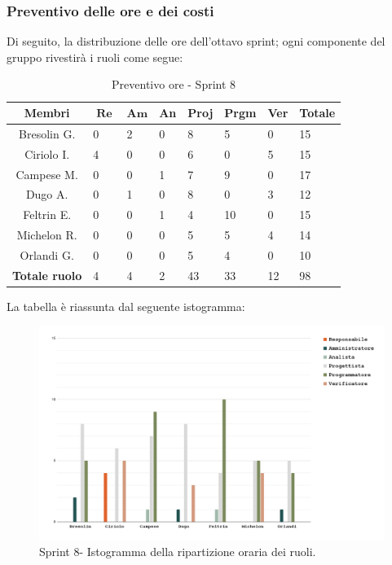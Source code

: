 \documentclass[10pt, a4paper]{article}
\begin{document}
\subsubsection{Preventivo delle ore e dei costi}
Di seguito, la distribuzione delle ore dell'ottavo sprint; ogni componente del gruppo rivestirà i ruoli come segue:
\begin{table}[H]
\begin{tabularx}{\textwidth}{c|X|X|X|X|X|X|X}
    \textbf{Membri} & $\operatorname{\textbf{Re}}$ & $\mathrm{\textbf{Am}}$ & \textbf{An} & \textbf{Proj} & \textbf{Prgm} & \textbf{Ver} & \textbf{Totale} \\
        \hline Bresolin G. & 0 & \cellcolor{primarycolor}2 & 0 & 8 & 5 & 0 & 15 \\
        \hline Ciriolo I.  & \cellcolor{primarycolor}4 & 0 & 0 & 6 & 0 & 5 & 15 \\
        \hline Campese M.  & 0 & 0 & 1 & 7 & \cellcolor{primarycolor}9 & 0 & 17 \\
        \hline Dugo A.     & 0 & 1 & 0 & \cellcolor{primarycolor}8 & 0 & 3 & 12 \\
        \hline Feltrin E.  & 0 & 0 & 1 & 4 & \cellcolor{primarycolor}10 & 0 & 15 \\
        \hline Michelon R. & 0 & 0 & 0 & 5 & 5 & \cellcolor{primarycolor}4 & 14 \\
        \hline Orlandi G.  & 0 & 0 & 0 & \cellcolor{primarycolor}5 & 4 & 0 & 10 \\
        \hline
        \textbf{Totale ruolo} & 4 & 4 & 2 & 43 & 33 & 12 & 98 
    \end{tabularx}
    \caption{Preventivo ore - Sprint 8}
    \end{table}

La tabella è riassunta dal seguente istogramma:
 \begin{figure}[H]
        \centering        
        \includegraphics[width=15.5cm]{istogrammi/istogramma_8_periodo.png}
        \caption{Sprint 8- Istogramma della ripartizione oraria dei ruoli. }
    \end{figure}
\end{document}
